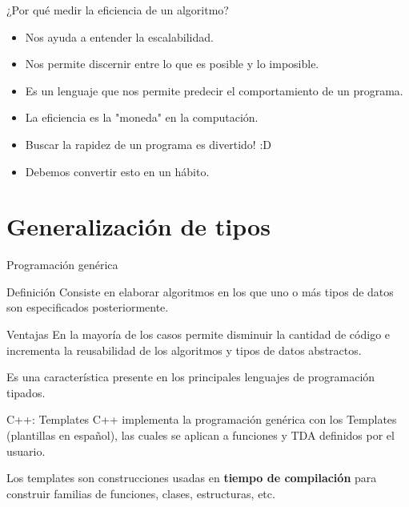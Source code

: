 \documentclass[aspectratio=169]{beamer}
\begin{document}
\begin{frame}{¿Por qué medir la eficiencia de un algoritmo? }
  \begin{itemize}
    \item Nos ayuda a entender la escalabilidad.
    \item Nos permite discernir entre lo que es posible y lo imposible.
    \item Es un lenguaje que nos permite predecir el comportamiento de un programa.
    \item La eficiencia es la "moneda" en la computación.
    \item Buscar la rapidez de un programa es divertido! :D
    \item \alert{Debemos convertir esto en un hábito.}
  \end{itemize}
\end{frame}

\section{Generalización de tipos}

\begin{frame}{Programación genérica}
  \begin{block}{Definición}
    Consiste en elaborar algoritmos en los que uno o más tipos de datos son especificados posteriormente. 
  \end{block}
  
  \begin{block}{Ventajas}
    En la mayoría de los casos permite disminuir la cantidad de código e incrementa la reusabilidad de los algoritmos y tipos de datos abstractos.
    
    Es una característica presente en los principales lenguajes de programación tipados.
  \end{block}
  
  \begin{block}{C++: Templates}
    C++ implementa la programación genérica con los \alert{Templates} (plantillas en español), las cuales se aplican a funciones y TDA definidos por el usuario.
  
    Los templates son construcciones usadas en \textbf{tiempo de compilación} para construir familias de funciones, clases, estructuras, etc.
  \end{block}
\end{frame}
\end{document}
